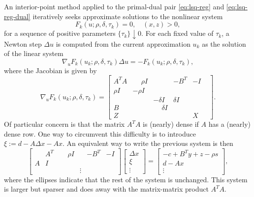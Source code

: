 \documentclass{amsart}
\begin{document}
An interior-point method applied to the primal-dual pair \eqref{eq:lsq-reg} and
\eqref{eq:lsq-reg-dual} iteratively seeks approximate solutions to the
nonlinear system
\[
  F_k(u; \rho, \delta, \tau_k) = 0, \quad (x,z) > 0,
\]
for a sequence of positive parameters $\{\tau_k\} \downarrow 0$. For each
fixed value of $\tau_k$, a Newton step $\Delta u$ is computed from the current
approximation $u_k$ as the solution of the linear system
\[
  \nabla_u F_k(u_k; \rho, \delta, \tau_k) \Delta u =
  -F_k(u_k; \rho, \delta, \tau_k),
\]
where the Jacobian is given by
\[
  \nabla_u F_k(u_k; \rho, \delta, \tau_k) =
  \begin{bmatrix}
    A^T \! A  & \phantom{-}\rho I   & & -B^T & -I \\
    \rho I & -\rho I & &      & \\
    & & -\delta I & \delta I & & \\
    B & & \phantom{-}\delta I & & & \\
    Z & & & & X
  \end{bmatrix}.
\]
Of particular concern is that the matrix $A^T \! A$ is (nearly) dense if $A$ has a
(nearly) dense row. One way to circumvent this difficulty is to introduce
$\xi := d - A \Delta x - Ax$. An equivalent way to write the previous system is
then
\[
  \begin{bmatrix}
    & A^T & \phantom{-}\rho I & & -B^T & -I \\
    A & I & & & & \\
    & & & \vdots & &
  \end{bmatrix}
  \begin{bmatrix}
    \Delta x \\ \xi \\ \vdots
  \end{bmatrix}
  =
  \begin{bmatrix}
    -c + B^T y + z - \rho s \\
    d - A x \\
    \vdots
  \end{bmatrix},
\]
where the ellipses indicate that the rest of the system is unchanged. This
system is larger but sparser and does away with the matrix-matrix product
$A^T \! A$.
\end{document}
